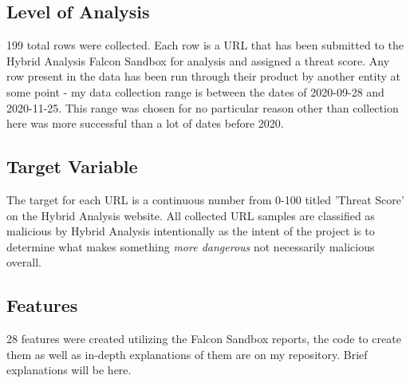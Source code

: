 \documentclass[conference]{IEEEtran}
\begin{document}
\subsection{Level of Analysis}
199 total rows were collected. Each row is a URL that has been submitted to the Hybrid Analysis Falcon Sandbox for analysis and assigned a threat score. Any row present in the data has been run through their product by another entity at some point - my data collection range is between the dates of 2020-09-28 and 2020-11-25. This range was chosen for no particular reason other than collection here was more successful than a lot of dates before 2020.

\subsection{Target Variable}

The target for each URL is a continuous number from 0-100 titled 'Threat Score' on the Hybrid Analysis website. All collected URL samples are classified as malicious by Hybrid Analysis intentionally as the intent of the project is to determine what makes something \textit{more dangerous} not necessarily malicious overall.

\subsection{Features}

28 features were created utilizing the Falcon Sandbox reports, the code to create them as well as in-depth explanations of them are on my repository. Brief explanations will be here.
\end{document}
